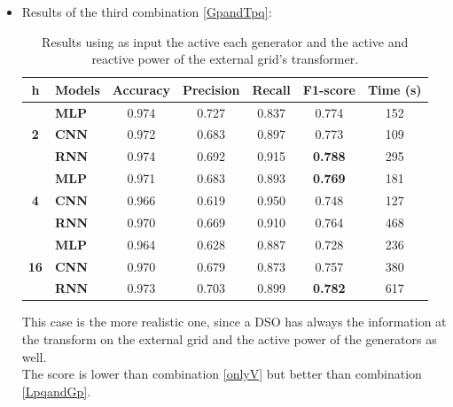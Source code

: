\begin{itemize}
    
    \item Results of the third combination \ref{GpandTpq}:
    
    \begin{table}[H]
    \centering
    \begin{tabular}{|c|l|c|c|c|c|c|}
    \hline
    \textbf{h} &
      \textbf{Models} &
      \multicolumn{1}{l|}{\textbf{Accuracy}} &
      \multicolumn{1}{l|}{\textbf{Precision}} &
      \multicolumn{1}{l|}{\textbf{Recall}} &
      \multicolumn{1}{l|}{\textbf{F1-score}} &
      \textbf{Time (s)} \\ \hline
    \multirow{3}{*}{\textbf{2}}  & \textbf{MLP} & 0.974 & 0.727 & 0.837 & 0.774          & 152  \\ \cline{2-7} 
                                 & \textbf{CNN} & 0.972 & 0.683 & 0.897 & 0.773          & 109  \\ \cline{2-7} 
                                 & \textbf{RNN} & 0.974 & 0.692 & 0.915 & \textbf{0.788} & 295  \\ \hline
    \multirow{3}{*}{\textbf{4}}  & \textbf{MLP} & 0.971 & 0.683 & 0.893 & \textbf{0.769} & 181  \\ \cline{2-7} 
                                 & \textbf{CNN} & 0.966 & 0.619 & 0.950 & 0.748          & 127  \\ \cline{2-7} 
                                 & \textbf{RNN} & 0.970 & 0.669 & 0.910 & 0.764          & 468  \\ \hline
    \multirow{3}{*}{\textbf{16}} & \textbf{MLP} & 0.964 & 0.628 & 0.887 & 0.728          & 236  \\ \cline{2-7} 
                                 & \textbf{CNN} & 0.970 & 0.679 & 0.873 & 0.757          & 380  \\ \cline{2-7} 
                                 & \textbf{RNN} & 0.973 & 0.703 & 0.899 & \textbf{0.782} & 617 \\ \hline
    \end{tabular}%
    \caption[Models' results using generators and the external grid information]{Results using as input the active each generator and the active and reactive power of the external grid's transformer.}
    \end{table}
    This case is the more realistic one, since a \gls{DSO} has always the information at the transform on the external grid and the active power of the generators as well.\\
    The score is lower than combination \ref{onlyV} but better than combination \ref{LpqandGp}.\\
    

\end{itemize}
